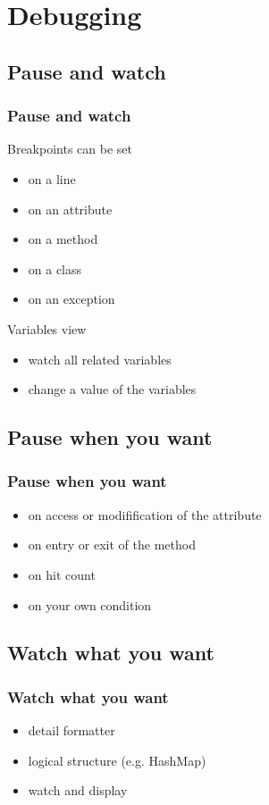 \documentclass{beamer}
\begin{document}
\section{Debugging}

\subsection{Pause and watch}
\begin{frame}[fragile]
\frametitle{Pause and watch}
Breakpoints can be set
\begin{itemize}
\item on a line
\item on an attribute
\item on a method
\item on a class
\item on an exception
\end{itemize}
Variables view
\begin{itemize}
\item watch all related variables
\item change a value of the variables
\end{itemize}
\end{frame}

\subsection{Pause when you want}
\begin{frame}[fragile]
\frametitle{Pause when you want}
\begin{itemize}
\item on access or modifification of the attribute
\item on entry or exit of the method
\item on hit count
\item on your own condition
\end{itemize}
\end{frame}

\subsection{Watch what you want}
\begin{frame}[fragile]
\frametitle{Watch what you want}
\begin{itemize}
\item detail formatter
\item logical structure (e.g. HashMap)
\item watch and display
\end{itemize}  
\end{frame}
\end{document}
